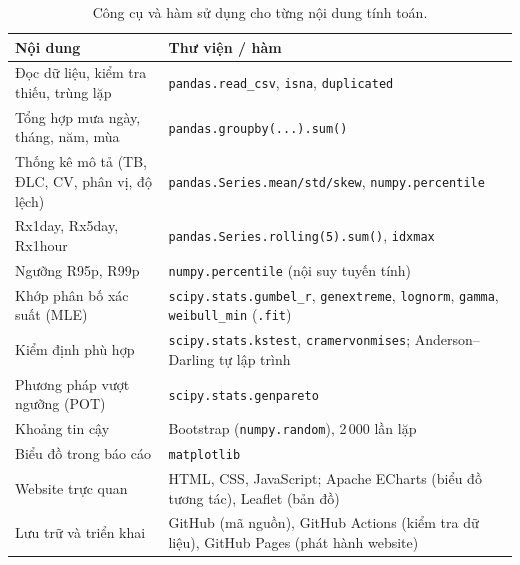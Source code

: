 \begin{table}[H]
  \centering
  \caption{Công cụ và hàm sử dụng cho từng nội dung tính toán.}
  \label{tab:congcu}
  \small
  \begin{tabularx}{\linewidth}{|>{\raggedright\arraybackslash}p{5.6cm}|>{\raggedright\arraybackslash}X|}
    \hline
    \textbf{Nội dung} & \textbf{Thư viện / hàm} \\
    \hline
    Đọc dữ liệu, kiểm tra thiếu, trùng lặp & \texttt{pandas.read\_csv}, \texttt{isna}, \texttt{duplicated} \\ \hline
    Tổng hợp mưa ngày, tháng, năm, mùa & \texttt{pandas.groupby(...).sum()} \\ \hline
    Thống kê mô tả (TB, ĐLC, CV, phân vị, độ lệch) & \texttt{pandas.Series.mean/std/skew}, \texttt{numpy.percentile} \\ \hline
    Rx1day, Rx5day, Rx1hour & \texttt{pandas.Series.rolling(5).sum()}, \texttt{idxmax} \\ \hline
    Ngưỡng R95p, R99p & \texttt{numpy.percentile} (nội suy tuyến tính) \\ \hline
    Khớp phân bố xác suất (MLE) & \texttt{scipy.stats.gumbel\_r}, \texttt{genextreme}, \texttt{lognorm}, \texttt{gamma}, \texttt{weibull\_min} (\texttt{.fit}) \\ \hline
    Kiểm định phù hợp & \texttt{scipy.stats.kstest}, \texttt{cramervonmises}; Anderson--Darling tự lập trình \\ \hline
    Phương pháp vượt ngưỡng (POT) & \texttt{scipy.stats.genpareto} \\ \hline
    Khoảng tin cậy & Bootstrap (\texttt{numpy.random}), 2\,000 lần lặp \\ \hline
    Biểu đồ trong báo cáo & \texttt{matplotlib} \\ \hline
    Website trực quan & HTML, CSS, JavaScript; Apache ECharts (biểu đồ tương tác), Leaflet (bản đồ) \\ \hline
    Lưu trữ và triển khai & GitHub (mã nguồn), GitHub Actions (kiểm tra dữ liệu), GitHub Pages (phát hành website) \\ \hline
  \end{tabularx}
\end{table}
